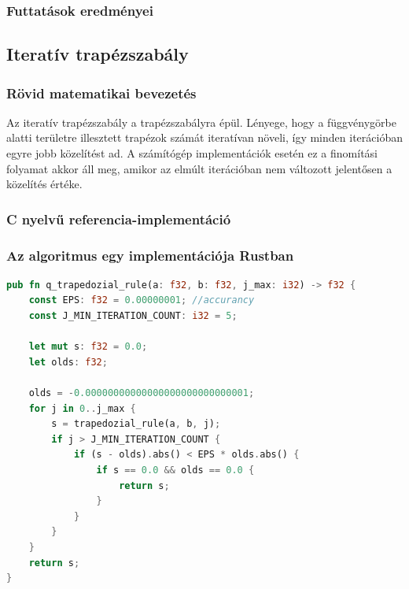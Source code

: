 \subsubsection{Futtatások eredményei}

\subsection{Iteratív trapézszabály}

\subsubsection{Rövid matematikai bevezetés}

Az iteratív trapézszabály a trapézszabályra épül. Lényege, hogy a függvénygörbe alatti területre illesztett trapézok számát iteratívan növeli, így minden iterációban egyre jobb közelítést ad. A számítógép implementációk esetén ez a finomítási folyamat akkor áll meg, amikor az elmúlt iterációban nem változott jelentősen a közelítés értéke.

\subsubsection{C nyelvű referencia-implementáció}

\subsubsection{Az algoritmus egy implementációja Rustban}
\begin{lstlisting}[language=Rust]
pub fn q_trapedozial_rule(a: f32, b: f32, j_max: i32) -> f32 {
    const EPS: f32 = 0.00000001; //accurancy
    const J_MIN_ITERATION_COUNT: i32 = 5;

    let mut s: f32 = 0.0;
    let olds: f32;

    olds = -0.00000000000000000000000000001;
    for j in 0..j_max {
        s = trapedozial_rule(a, b, j);
        if j > J_MIN_ITERATION_COUNT {
            if (s - olds).abs() < EPS * olds.abs() {
                if s == 0.0 && olds == 0.0 {
                    return s;
                }
            }
        }
    }
    return s;
}
\end{lstlisting}

